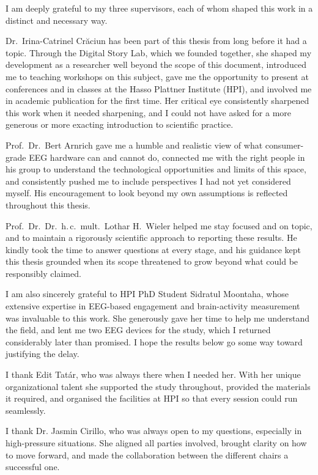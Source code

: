 \documentclass[12pt,a4paper]{report}
\begin{document}
I am deeply grateful to my three supervisors, each of whom shaped this work in a distinct and necessary way.

Dr.\ Irina-Catrinel Crăciun has been part of this thesis from long before it had a topic. Through the Digital Story Lab, which we founded together, she shaped my development as a researcher well beyond the scope of this document, introduced me to teaching workshops on this subject, gave me the opportunity to present at conferences and in classes at the Hasso Plattner Institute (HPI), and involved me in academic publication for the first time. Her critical eye consistently sharpened this work when it needed sharpening, and I could not have asked for a more generous or more exacting introduction to scientific practice.

Prof.\ Dr.\ Bert Arnrich gave me a humble and realistic view of what consumer-grade EEG hardware can and cannot do, connected me with the right people in his group to understand the technological opportunities and limits of this space, and consistently pushed me to include perspectives I had not yet considered myself. His encouragement to look beyond my own assumptions is reflected throughout this thesis.

Prof.\ Dr.\ Dr.\ h.\,c.\ mult.\ Lothar H.\ Wieler helped me stay focused and on topic, and to maintain a rigorously scientific approach to reporting these results. He kindly took the time to answer questions at every stage, and his guidance kept this thesis grounded when its scope threatened to grow beyond what could be responsibly claimed.

I am also sincerely grateful to HPI PhD Student Sidratul Moontaha, whose extensive expertise in EEG-based engagement and brain-activity measurement was invaluable to this work. She generously gave her time to help me understand the field, and lent me two EEG devices for the study, which I returned considerably later than promised. I hope the results below go some way toward justifying the delay.

I thank Edit Tatár, who was always there when I needed her. With her unique organizational talent she supported the study throughout, provided the materials it required, and organised the facilities at HPI so that every session could run seamlessly.

I thank Dr. Jasmin Cirillo, who was always open to my questions, especially in high-pressure situations. She aligned all parties involved, brought clarity on how to move forward, and made the collaboration between the different chairs a successful one.
\end{document}
